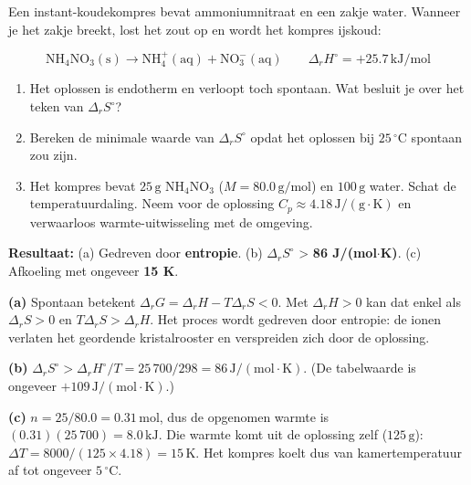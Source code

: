 \begin{oefening}\label{oef:h3-7}
Een instant-koudekompres bevat ammoniumnitraat en een zakje water. Wanneer je het zakje breekt, lost het zout op en wordt het kompres ijskoud:

\[
\mathrm{NH_4NO_3(s) \rightarrow NH_4^+(aq) + NO_3^-(aq)} \qquad \Delta_r H^\circ = +25.7\,\mathrm{kJ/mol}
\]

\begin{enumerate}
\item[(a)]
  Het oplossen is endotherm en verloopt toch spontaan. Wat besluit je over het teken van \(\Delta_r S^\circ\)?
\item[(b)]
  Bereken de minimale waarde van \(\Delta_r S^\circ\) opdat het oplossen bij \(25\,^\circ\mathrm{C}\) spontaan zou zijn.
\item[(c)]
  Het kompres bevat \(25\,\mathrm{g}\) \(\mathrm{NH_4NO_3}\) (\(M = 80.0\,\mathrm{g/mol}\)) en \(100\,\mathrm{g}\) water. Schat de temperatuurdaling. Neem voor de oplossing \(C_p \approx 4.18\,\mathrm{J/(g\cdot K)}\) en verwaarloos warmte-uitwisseling met de omgeving.
\end{enumerate}
\end{oefening}
\begin{oplossing}
\textbf{Resultaat:} (a) Gedreven door \textbf{entropie}. (b) \(\Delta_r S^\circ\) \textgreater{} \textbf{86 J/(mol\ensuremath{\cdot{}}K)}. (c) Afkoeling met ongeveer \textbf{15 K}.

\textbf{(a)} Spontaan betekent \(\Delta_r G = \Delta_r H - T\Delta_r S < 0\). Met \(\Delta_r H > 0\) kan dat enkel als \(\Delta_r S > 0\) en \(T\Delta_r S > \Delta_r H\). Het proces wordt gedreven door entropie: de ionen verlaten het geordende kristalrooster en verspreiden zich door de oplossing.

\textbf{(b)} \(\Delta_r S^\circ > \Delta_r H^\circ/T = 25\,700/298 = 86\,\mathrm{J/(mol\cdot K)}\). (De tabelwaarde is ongeveer \(+109\,\mathrm{J/(mol\cdot K)}\).)

\textbf{(c)} \(n = 25/80.0 = 0.31\,\mathrm{mol}\), dus de opgenomen warmte is \((0.31)(25\,700) = 8.0\,\mathrm{kJ}\). Die warmte komt uit de oplossing zelf (\(125\,\mathrm{g}\)): \(\Delta T = 8000/(125 \times 4.18) = 15\,\mathrm{K}\). Het kompres koelt dus van kamertemperatuur af tot ongeveer \(5\,^\circ\mathrm{C}\).
\end{oplossing}

